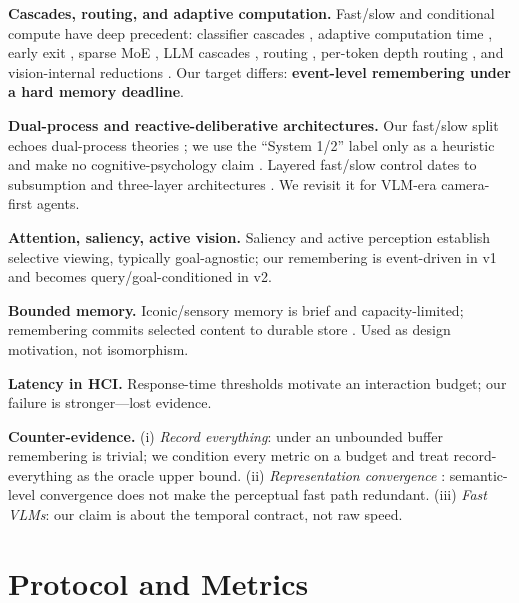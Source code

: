 \documentclass[11pt,a4paper]{article}
\begin{document}
\textbf{Cascades, routing, and adaptive computation.} Fast/slow and conditional compute have deep precedent: classifier cascades \citep{viola2001rapid}, adaptive computation time \citep{graves2016adaptive}, early exit \citep{teerapittayanon2016earlyexit}, sparse MoE \citep{shazeer2017outrageously}, LLM cascades \citep{chen2023frugalgpt,aggarwal2023automix}, routing \citep{ong2024routellm}, per-token depth routing \citep{raposo2024mod}, and vision-internal reductions \citep{rao2021dynamicvit,bolya2023tome}. Our target differs: \textbf{event-level remembering under a hard memory deadline}.

\textbf{Dual-process and reactive-deliberative architectures.} Our fast/slow split echoes dual-process theories \citep{kahneman2011thinking,evans2013dual}; we use the ``System 1/2'' label only as a heuristic and make no cognitive-psychology claim \citep{melnikoff2018mythical}. Layered fast/slow control dates to subsumption \citep{brooks1986robust} and three-layer architectures \citep{gat1998on}. We revisit it for VLM-era camera-first agents.

\textbf{Attention, saliency, active vision.} Saliency \citep{itti1998saliency} and active perception \citep{bajcsy1988active,mnih2014ram} establish selective viewing, typically goal-agnostic; our remembering is event-driven in v1 and becomes query/goal-conditioned in v2.

\textbf{Bounded memory.} Iconic/sensory memory is brief and capacity-limited; remembering commits selected content to durable store \citep{sperling1960brief,atkinson1968human,baddeley1974working,cowan2001magical}. Used as design motivation, not isomorphism.

\textbf{Latency in HCI.} Response-time thresholds \citep{miller1968response,nielsen1993usability} motivate an interaction budget; our failure is stronger---lost evidence.

\textbf{Counter-evidence.} (i) \emph{Record everything}: under an unbounded buffer remembering is trivial; we condition every metric on a budget and treat record-everything as the oracle upper bound. (ii) \emph{Representation convergence} \citep{huh2024platonic}: semantic-level convergence does not make the perceptual fast path redundant. (iii) \emph{Fast VLMs}: our claim is about the temporal contract, not raw speed.

\section{Protocol and Metrics}
\end{document}
